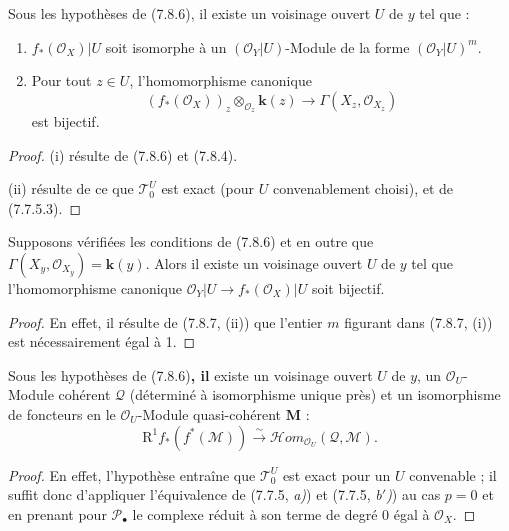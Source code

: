\begin{corollary}[7.8.7]
Sous les hypothèses de \textup{(7.8.6)}, il existe un voisinage ouvert $U$ de $y$ tel
que :
\begin{enumerate}
  \item[\textup{(i)}] $f_*(\mathscr O_X)|U$ soit isomorphe à un
    $(\mathscr O_Y|U)$-Module de la forme $(\mathscr O_Y|U)^m$.
  \item[\textup{(ii)}] Pour tout $z\in U$, l'homomorphisme canonique
    \[
      (f_*(\mathscr O_X))_z
      \otimes_{\mathscr O_z}\boldsymbol{k}(z)
      \longrightarrow
      \Gamma(X_z,\mathscr O_{X_z})
    \]
    est bijectif.
\end{enumerate}
\end{corollary}

\begin{proof}
(i) résulte de (7.8.6) et (7.8.4).

(ii) résulte de ce que $\mathscr T_0^U$ est exact (pour $U$ convenablement
choisi), et de (7.7.5.3).
\end{proof}

\begin{corollary}[7.8.8]
Supposons vérifiées les conditions de \textup{(7.8.6)} et en outre que
$\Gamma(X_y,\mathscr O_{X_y})=\boldsymbol{k}(y)$. Alors il existe un voisinage ouvert
$U$ de $y$ tel que l'homomorphisme canonique
$\mathscr O_Y|U\to f_*(\mathscr O_X)|U$ soit bijectif.
\end{corollary}

\begin{proof}
En effet, il résulte de (7.8.7, (ii)) que l'entier $m$ figurant dans (7.8.7,
(i)) est nécessairement égal à 1.
\end{proof}

\begin{corollary}[7.8.9]
Sous les hypothèses de \textup{(7.8.6)}\textbf{, il} existe un voisinage ouvert $U$ de $y$, un
$\mathscr O_U$-Module cohérent $\mathscr Q$ (déterminé à isomorphisme unique
près) et un isomorphisme de foncteurs en le $\mathscr O_U$-Module quasi-cohérent
$\mathbf M$ :
\[
  \mathrm R^1f_*(f^*(\mathscr M))
  \xrightarrow{\sim}
  \mathscr{H}\!om_{\mathscr O_U}(\mathscr Q,\mathscr M).
  \tag{7.8.9.1}\label{III.7.8.9.1.fr}
\]
\end{corollary}

\begin{proof}
En effet, l'hypothèse entraîne que $\mathscr T_0^U$ est exact pour un $U$
convenable ; il suffit donc d'appliquer l'équivalence de (7.7.5, \emph{a)}) et
(7.7.5, \emph{b$'$)}) au cas $p=0$ et en prenant pour $\mathscr P_\bullet$ le complexe
réduit à son terme de degré 0 égal à $\mathscr O_X$.
\end{proof}

